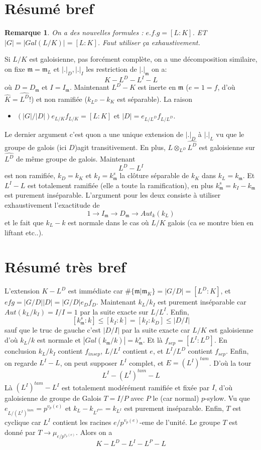 \documentclass[a4paper,12pt]{book}
\newcommand{\m}{\mathfrak m}
\theoremstyle{plain}
\newtheorem{rem}{Remarque}
\theoremstyle{definition}
\theoremstyle{remark}
\begin{document}
\section{Résumé bref}
\begin{rem}
    On a des nouvelles formules : $e.f.g=[L:K]$. ET $|G|=
    |Gal(L/K)|=[L:K]$. Faut utiliser ça exhaustivement.
\end{rem}
Si $L/K$ est galoisienne, pas forcément complète, on a une
décomposition similaire, on fixe $\m=\m_L$ et $|.|_D,|.|_I$ les
restriction de $|.|_\m$ on a:
\[K-L^D-L^I-L\]
où $D=D_\m$ et $I=I_\m$. Maintenant $L^D-K$ est inerte en $\m$
($e=1=f$, d'où $\hat K=\hat{L^D}$!) et non ramifiée
($k_{L^D}-k_K$ est séparable). La raison 
\begin{itemize}
    \item $(|G|/|D|)e_{L/K}f_{L/K}=[L:K]$ et $|D|=e_{L/L^D}f_{L/L^D}$.
\end{itemize}
Le dernier argument c'est quon a une unique extension de 
$|.|_D$ à $|.|_L$ vu que le groupe de galois (ici $D$)agit
transitivement. En plus, $L\otimes_{L^D}\hat{L^D}$ est galoisienne
sur $\hat{L^D}$ de même groupe de galois. 
Maintenant
\[L^D-L^I\]
est non ramifiée, $k_D=k_K$ et $k_I=k_\m^s$ la clôture séparable
de $k_K$ dans $k_L=k_\m$. Et $L^I-L$ est totalement ramifiée
(elle a toute la ramification), en plus $k_\m^s=k_I-k_\m$ est
purement inséparable. L'argument pour les deux consiste à utiliser
exhaustivement l'exactitude de
\[1\to I_\m\to D_\m\to Aut_{k}(k_L)\]
et le fait que $k_L-k$ est normale dans le cas où $L/K$ galois 
(ca se montre bien en liftant etc..).




\section{Résumé très bref}
L'extension $K-L^D$ est immédiate car 
$\#\{\m|\m_K\}=|G/D|=[L^D:K]$, et $efg=|G/D||D|=|G/D|e_Df_D$.
Maintenant $k_L/k_I$ est purement inséparable car $Aut(k_L/k_I)=
I/I=1$ par la suite exacte sur $L/L^I$. Enfin, 
\[[k_\m^s:k]\leq [k_I:k]=[k_I:k_D]\leq |D/I|\]
sauf que le truc de gauche c'est $|D/I|$ par la suite exacte car
$L/K$ est galoisienne d'où $k_L/k$ est normale et 
$|Gal(k_\m/k)|=k_\m^s$. Et là $f_{sep}=[L^I:L^D]$. En conclusion
$k_L/k_I$ contient $f_{insep}$, $L/L^I$ contient
$e$, et $L^I/L^D$ contient $f_{sep}$. Enfin, on regarde $L^I-L$,
on peut supposer $L^I$ complet, et $E=(L^I)^{tam}$. D'où la tour
\[L^I-(L^I)^{tam}-L\]
Là $(L^I)^{tam}-L^I$ est totalement modérément ramifiée et
fixée par $I$, d'où galoisienne de groupe de Galois $T=I/P$ avec
$P$ le (car normal) $p$-sylow. Vu que 
$e_{L/(L^I)^{tam}}=p^{v_p(e)}$ et 
$k_L-k_{L^{I^{tam}}}=k_{L^I}$ est purement inséparable. Enfin,
$T$ est cyclique car $L^I$ contient les racines $e/p^{v_p(e)}$-eme
de l'unité. Le groupe $T$ est donné par $T\to \mu_{e/p^{v_p(e)}}$.
Alors on a
\[K-L^D-L^I-L^P-L\]
\end{document}
